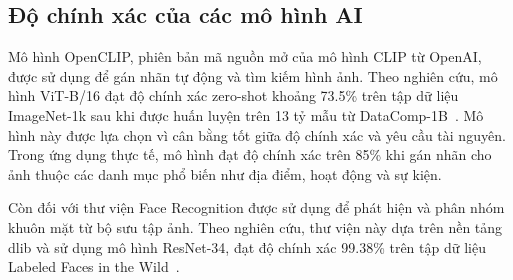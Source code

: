 \subsection{Độ chính xác của các mô hình AI}

Mô hình OpenCLIP, phiên bản mã nguồn mở của mô hình CLIP từ OpenAI, được sử dụng để gán nhãn tự động và tìm kiếm hình ảnh. Theo nghiên cứu, mô hình ViT-B/16 đạt độ chính xác zero-shot khoảng 73.5\% trên tập dữ liệu ImageNet-1k sau khi được huấn luyện trên 13 tỷ mẫu từ DataComp-1B~\cite{opencliptesting}. Mô hình này được lựa chọn vì cân bằng tốt giữa độ chính xác và yêu cầu tài nguyên. Trong ứng dụng thực tế, mô hình đạt độ chính xác trên 85\% khi gán nhãn cho ảnh thuộc các danh mục phổ biến như địa điểm, hoạt động và sự kiện.

Còn đối với thư viện Face Recognition được sử dụng để phát hiện và phân nhóm khuôn mặt từ bộ sưu tập ảnh. Theo nghiên cứu, thư viện này dựa trên nền tảng dlib và sử dụng mô hình ResNet-34, đạt độ chính xác 99.38\% trên tập dữ liệu Labeled Faces in the Wild~\cite{facetesting}. 